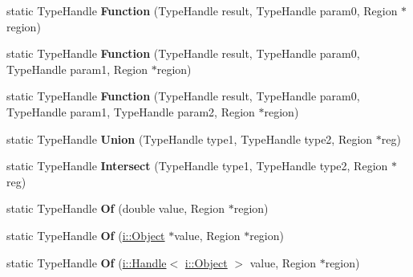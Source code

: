 \begin{DoxyCompactItemize}
\item 
\hypertarget{classv8_1_1internal_1_1_type_impl_ab4f0887cef86261b3fe9b6778c7a9f9f}{}static Type\+Handle {\bfseries Function} (Type\+Handle result, Type\+Handle param0, Region $\ast$region)\label{classv8_1_1internal_1_1_type_impl_ab4f0887cef86261b3fe9b6778c7a9f9f}

\item 
\hypertarget{classv8_1_1internal_1_1_type_impl_ad8cca45a55a2419e7ddf59566571cd1c}{}static Type\+Handle {\bfseries Function} (Type\+Handle result, Type\+Handle param0, Type\+Handle param1, Region $\ast$region)\label{classv8_1_1internal_1_1_type_impl_ad8cca45a55a2419e7ddf59566571cd1c}

\item 
\hypertarget{classv8_1_1internal_1_1_type_impl_a08d31ec12f1558e90c13fcb181564051}{}static Type\+Handle {\bfseries Function} (Type\+Handle result, Type\+Handle param0, Type\+Handle param1, Type\+Handle param2, Region $\ast$region)\label{classv8_1_1internal_1_1_type_impl_a08d31ec12f1558e90c13fcb181564051}

\item 
\hypertarget{classv8_1_1internal_1_1_type_impl_addc3ca157c2e187ef6b778b5ddd6e6b5}{}static Type\+Handle {\bfseries Union} (Type\+Handle type1, Type\+Handle type2, Region $\ast$reg)\label{classv8_1_1internal_1_1_type_impl_addc3ca157c2e187ef6b778b5ddd6e6b5}

\item 
\hypertarget{classv8_1_1internal_1_1_type_impl_aa95ff4a0361c1f66efaa7ef47fbbefcf}{}static Type\+Handle {\bfseries Intersect} (Type\+Handle type1, Type\+Handle type2, Region $\ast$reg)\label{classv8_1_1internal_1_1_type_impl_aa95ff4a0361c1f66efaa7ef47fbbefcf}

\item 
\hypertarget{classv8_1_1internal_1_1_type_impl_a2543fab1b88e06d1dcf7ed87952bffb0}{}static Type\+Handle {\bfseries Of} (double value, Region $\ast$region)\label{classv8_1_1internal_1_1_type_impl_a2543fab1b88e06d1dcf7ed87952bffb0}

\item 
\hypertarget{classv8_1_1internal_1_1_type_impl_ace76871d02ef41d93c2c6b532f2c1255}{}static Type\+Handle {\bfseries Of} (\hyperlink{classv8_1_1internal_1_1_object}{i\+::\+Object} $\ast$value, Region $\ast$region)\label{classv8_1_1internal_1_1_type_impl_ace76871d02ef41d93c2c6b532f2c1255}

\item 
\hypertarget{classv8_1_1internal_1_1_type_impl_a72047657bece1b4acc9e0e2734016aa6}{}static Type\+Handle {\bfseries Of} (\hyperlink{classv8_1_1internal_1_1_handle}{i\+::\+Handle}$<$ \hyperlink{classv8_1_1internal_1_1_object}{i\+::\+Object} $>$ value, Region $\ast$region)\label{classv8_1_1internal_1_1_type_impl_a72047657bece1b4acc9e0e2734016aa6}


\end{DoxyCompactItemize}

